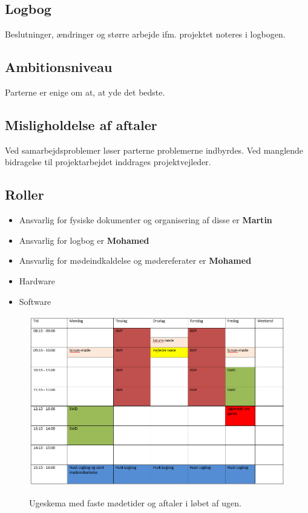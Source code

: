 \subsection*{Logbog}
Beslutninger, ændringer og større arbejde ifm. projektet noteres i logbogen. 

\subsection*{Ambitionsniveau}
Parterne er enige om at, at yde det bedste. 
 
\subsection*{Misligholdelse af aftaler}
Ved samarbejdsproblemer løser parterne problemerne indbyrdes. 
Ved manglende bidragelse til projektarbejdet inddrages projektvejleder.

 
\subsection*{Roller}
\begin{itemize}
\item Ansvarlig for fysiske dokumenter og organisering af disse er \textbf{Martin}
\item Ansvarlig for logbog er \textbf{Mohamed}
\item Ansvarlig for mødeindkaldelse og mødereferater er \textbf{Mohamed}
\item{Hardware}
\item{Software}
\end{itemize}

\begin{figure}[H]
\centering
{\includegraphics[width=16cm]
{Figure/Ugeplan}}
\caption{Ugeskema med faste mødetider og aftaler i løbet af ugen.}
\label{ugeplan}
\end{figure}

